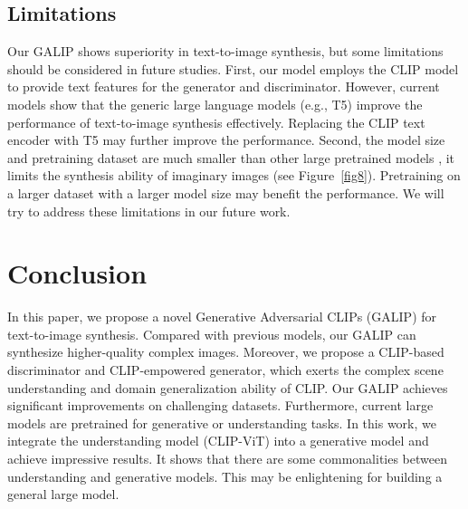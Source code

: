 \documentclass[10pt,twocolumn,letterpaper]{article}
\begin{document}
\subsection{Limitations}
Our GALIP shows superiority in text-to-image synthesis, but some limitations should be considered in future studies. 
First, our model employs the CLIP model to provide text features for the generator and discriminator.
However, current models \cite{saharia2022photorealistic} show that the generic large language models \cite{raffel2020exploring} (e.g., T5) improve the performance of text-to-image synthesis effectively.
Replacing the CLIP text encoder with T5 may further improve the performance.
Second, the model size and pretraining dataset are much smaller than other large pretrained models \cite{rombach2022high,yu2022scaling,ramesh2022hierarchical,saharia2022photorealistic,balaji2022ediffi}, 
it limits the synthesis ability of imaginary images (see Figure~\ref{fig8}). 
Pretraining on a larger dataset  with a larger model size may benefit the performance.
We will try to address these limitations in our future work.


\section{Conclusion}
In this paper, we propose a novel Generative Adversarial CLIPs (GALIP) for text-to-image synthesis. 
Compared with previous models, our GALIP can synthesize higher-quality complex images.
Moreover, we propose a CLIP-based discriminator and CLIP-empowered generator, which exerts the complex scene understanding and domain generalization ability of CLIP.
Our GALIP achieves significant improvements on challenging datasets.
Furthermore, current large models are pretrained for generative or understanding tasks.
In this work, we integrate the understanding model (CLIP-ViT) into a generative model and achieve impressive results.
It shows that there are some commonalities between understanding and generative models.
This may be enlightening for building a general large model.


{\small


}
\end{document}
